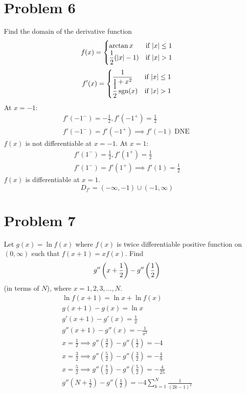 \documentclass[12pt]{article}
\newcommand*{\paren}[1]{\ensuremath\left(#1\right)}
\newcommand{\problem}[1]{\section{Problem #1}}
\DeclareMathOperator{\dne}{DNE}
\DeclareMathOperator{\sgn}{sgn}
\begin{document}
\problem{6}
Find the domain of the derivative function
\[
f(x)=\begin{cases}
    \arctan x & $if $ |x|\le 1\\
    \dfrac{1}{2}(|x|-1) &$if $ |x|>1
\end{cases}
\]
\[
    f'(x)=\begin{cases}
        \dfrac{1}{1+x^2} & $if $ |x|\le 1\\
        \dfrac{1}{2}\sgn (x) &$if $ |x|>1
    \end{cases}
\]
At $x=-1$:
\begin{gather*}
    f'(-1^-)=-\frac{1}{2},f'(-1^+)=\frac{1}{2}\\
    f'(-1^-)=f'(-1^+)\implies f'(-1)\dne
\end{gather*}
$f(x)$ is not differentiable at $x=-1$. At $x=1$:
\begin{gather*}
    f'(1^-)=\frac{1}{2}, f'(1^+)=\frac{1}{2}\\
    f'(1^-)=f'(1^+)\implies f'(1)=\frac{1}{2}
\end{gather*}
$f(x)$ is differentiable at $x=1$.
\[
\boxed{D_{f'} =(-\infty ,-1) \cup (-1,\infty)}
\]

\problem{7}
Let $g(x)=\ln f(x)$ where $f(x)$ is twice differentiable positive function on $(0,\infty)$ such that $f(x+1)=xf(x)$. Find
\[
g''\paren{x+\frac{1}{2}}-g''\paren{\frac{1}{2}}
\]
(in terms of $N$), where $x=1,2,3,\dots ,N.$
\begin{gather*}
    \ln f(x+1)=\ln x+\ln f(x)\\
    g(x+1)-g(x)=\ln x\\
    g'(x+1)-g'(x)=\frac{1}{x}\\
    g''(x+1)-g''(x)=-\frac{1}{x^2}\\ 
    x=\frac{1}{2} \implies g''(\frac{3}{2})-g''(\frac{1}{2})=-4\\
    x=\frac{3}{2} \implies g''(\frac{5}{2})-g''(\frac{3}{2})= -\frac{4}{9}\\
    x=\frac{5}{2} \implies g''(\frac{7}{2})-g''(\frac{5}{2})=-\frac{4}{25}\\
    \boxed{g''(N+\frac{1}{2})-g''(\frac{1}{2})=-4 \sum_{k=1}^N\frac{1}{(2k-1)^2}}
\end{gather*}
\end{document}
